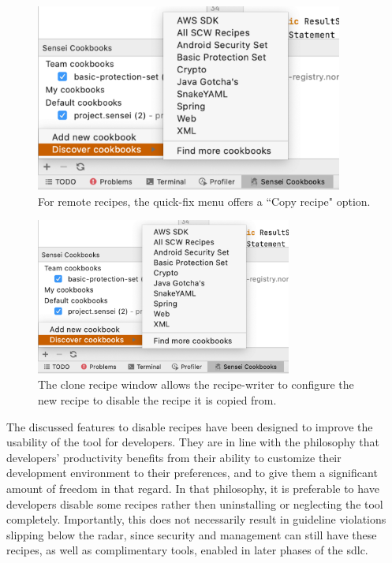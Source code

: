 \begin{figure}
  \centering
  \includegraphics[width=0.9\textwidth,page=4]{04-tools/figures/figures1.pdf}
  \caption[Copy recipe option in the quick-fix menu]{For remote recipes, the quick-fix menu offers a ``Copy recipe" option.}
  \label{fig:copyrecipe} 
\end{figure}

\begin{figure}
  \centering
  \includegraphics[width=0.75\textwidth,page=2]{04-tools/figures/figures1.pdf}
  \caption[Clone recipe window]{The clone recipe window allows the recipe-writer to configure the new recipe to disable the recipe it is copied from.}
  \label{fig:clonewindow} 
\end{figure}

The discussed features to disable recipes have been designed to improve the usability of the tool for developers.
They are in line with the philosophy that developers' productivity benefits from their ability to customize their development environment to their preferences, and to give them a significant amount of freedom in that regard.
In that philosophy, it is preferable to have developers disable some recipes rather then uninstalling or neglecting the tool completely.
Importantly, this does not necessarily result in guideline violations slipping below the radar, since security and management can still have these recipes, as well as complimentary tools, enabled in later phases of the \gls{sdlc}.

